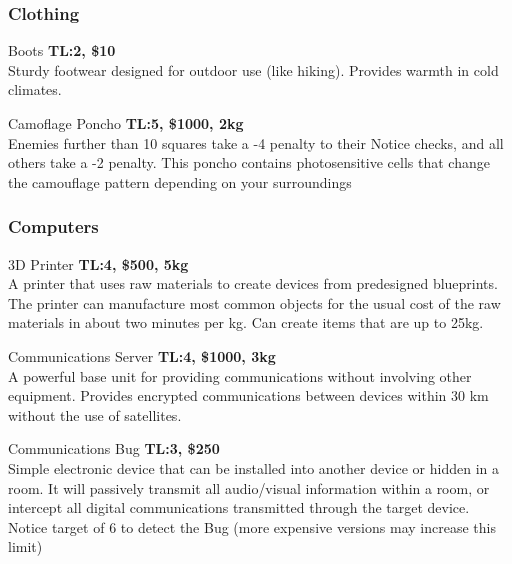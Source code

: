 \begin{multicols}{2}

\subsubsection{Clothing}

\begin{genericsection}{Boots}
\textbf{TL:2, \$10}\\
Sturdy footwear designed for outdoor use (like hiking). Provides warmth in cold climates.
\end{genericsection}

\begin{genericsection}{Camoflage Poncho}
\textbf{TL:5, \$1000, 2kg}\\
Enemies further than 10 squares take a -4 penalty to their Notice checks, and all others take a -2 penalty. This poncho contains photosensitive cells that change the camouflage pattern depending on your surroundings
\end{genericsection}

\subsubsection{Computers}

\begin{genericsection}{3D Printer}
\textbf{TL:4, \$500, 5kg}\\
A printer that uses raw materials to create devices from predesigned blueprints. The printer can manufacture most common objects for the usual cost of the raw materials in about two minutes per kg. Can create items that are up to 25kg.
\end{genericsection}

\begin{genericsection}{Communications Server}
\textbf{TL:4, \$1000, 3kg}\\
A powerful base unit for providing communications without involving other equipment. Provides encrypted communications between devices within 30 km without the use of satellites.
\end{genericsection}

\begin{genericsection}{Communications Bug}
\textbf{TL:3, \$250}\\
Simple electronic device that can be installed into another device or hidden in a room. It will passively transmit all audio/visual information within a room, or intercept all digital communications transmitted through the target device. Notice target of 6 to detect the Bug (more expensive versions may increase this limit)
\end{genericsection}


\end{multicols}

